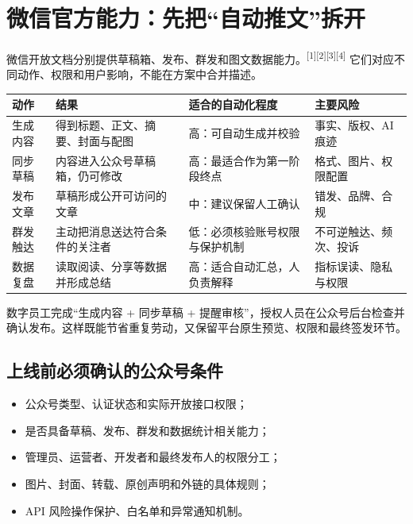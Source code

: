 \documentclass[UTF8,11pt,a4paper,fontset=none]{ctexart}
\newcommand{\srcref}[1]{\textsuperscript{\textcolor{BrandBlue}{[#1]}}}
\begin{document}
\section{微信官方能力：先把“自动推文”拆开}

微信开放文档分别提供草稿箱、发布、群发和图文数据能力。\srcref{1}\srcref{2}\srcref{3}\srcref{4} 它们对应不同动作、权限和用户影响，不能在方案中合并描述。

\begin{tabularx}{\textwidth}{@{}L{29mm} L{40mm} Y L{35mm}@{}}
\toprule
\textbf{动作} & \textbf{结果} & \textbf{适合的自动化程度} & \textbf{主要风险} \\
\midrule
生成内容 & 得到标题、正文、摘要、封面与配图 & 高：可自动生成并校验 & 事实、版权、AI 痕迹 \\
同步草稿 & 内容进入公众号草稿箱，仍可修改 & 高：最适合作为第一阶段终点 & 格式、图片、权限配置 \\
发布文章 & 草稿形成公开可访问的文章 & 中：建议保留人工确认 & 错发、品牌、合规 \\
群发触达 & 主动把消息送达符合条件的关注者 & 低：必须核验账号权限与保护机制 & 不可逆触达、频次、投诉 \\
数据复盘 & 读取阅读、分享等数据并形成总结 & 高：适合自动汇总，人负责解释 & 指标误读、隐私与权限 \\
\bottomrule
\end{tabularx}

\begin{summarybox}[最稳妥的第一阶段边界]
数字员工完成“生成内容 + 同步草稿 + 提醒审核”，授权人员在公众号后台检查并确认发布。这样既能节省重复劳动，又保留平台原生预览、权限和最终签发环节。
\end{summarybox}

\subsection{上线前必须确认的公众号条件}

\begin{itemize}
  \item 公众号类型、认证状态和实际开放接口权限；
  \item 是否具备草稿、发布、群发和数据统计相关能力；
  \item 管理员、运营者、开发者和最终发布人的权限分工；
  \item 图片、封面、转载、原创声明和外链的具体规则；
  \item API 风险操作保护、白名单和异常通知机制。
\end{itemize}
\end{document}

